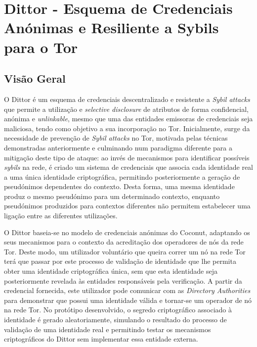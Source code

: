 
%

\chapter{Dittor - Esquema de Credenciais Anónimas e Resiliente a Sybils para o Tor}
\label{cha:dittor}

\section{Visão Geral}
\label{sec:dittor_visao_geral}

O Dittor é um esquema de credenciais descentralizado e resistente a \textit{Sybil attacks} que permite a utilização e \textit{selective disclosure} de atributos de forma confidencial, anónima e \textit{unlinkable}, mesmo que uma das entidades emissoras de credenciais seja maliciosa, tendo como objetivo a sua incorporação no Tor. Inicialmente, surge da necessidade de prevenção de \textit{Sybil attacks} no Tor, motivada pelas técnicas demonstradas anteriormente e culminando num paradigma diferente para a mitigação deste tipo de ataque: ao invés de mecanismos para identificar possíveis \textit{sybils} na rede, é criado um sistema de credenciais que associa cada identidade real a uma única identidade criptográfica, permitindo posteriormente a geração de pseudónimos dependentes do contexto. Desta forma, uma mesma identidade produz o mesmo pseudónimo para um determinado contexto, enquanto pseudónimos produzidos para contextos diferentes não permitem estabelecer uma ligação entre as diferentes utilizações.

O Dittor baseia-se no modelo de credenciais anónimas do Coconut, adaptando os seus mecanismos para o contexto da acreditação dos operadores de nós da rede Tor. Deste modo, um utilizador voluntário que queira correr um nó na rede Tor terá que passar por este processo de validação de identidade que lhe permita obter uma identidade criptográfica única, sem que esta identidade seja posteriormente revelada às entidades responsáveis pela verificação. A partir da credencial fornecida, este utilizador pode comunicar com as \textit{Directory Authorities} para demonstrar que possui uma identidade válida e tornar-se um operador de nó na rede Tor. No protótipo desenvolvido, o segredo criptográfico associado à identidade é gerado aleatoriamente, simulando o resultado do processo de validação de uma identidade real e permitindo testar os mecanismos criptográficos do Dittor sem implementar essa entidade externa.

